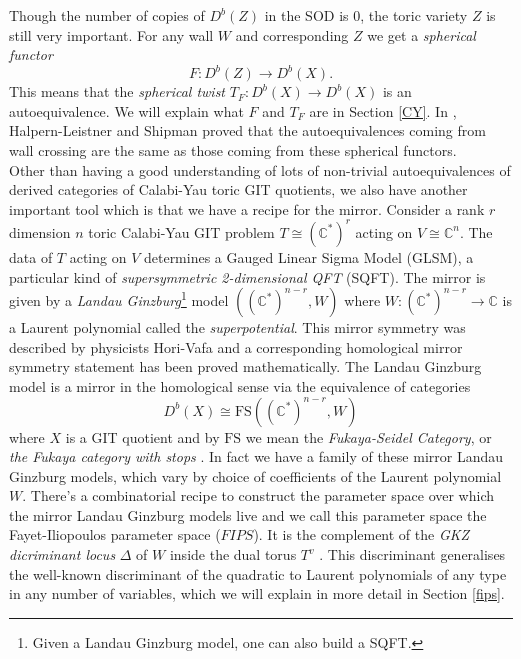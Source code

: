 \documentclass[oneside]{amsart}
\theoremstyle{definition}
\theoremstyle{definition}
\theoremstyle{definition}
\theoremstyle{definition}
\newcommand{\CC}{\mathbb{C}}
\begin{document}
\newline
Though the number of copies of $D^b(Z)$ in the SOD is 0, the toric variety $Z$ is still very important. For any wall $W$ and corresponding $Z$ we get a \textit{spherical functor}
$$
F : D^b(Z) \to D^b(X).
$$
This means that the \textit{spherical twist} $T_F: D^b(X) \to  D^b(X) $ is an autoequivalence. We will explain what $F$ and $T_F$ are in Section \ref{CY}. In \cite{gitauto}, Halpern-Leistner and Shipman proved that the autoequivalences coming from wall crossing are the same as those coming from these spherical functors. \\
\newline
Other than having a good understanding of lots of non-trivial autoequivalences of derived categories of Calabi-Yau toric GIT quotients, we also have another important tool which is that we have a recipe for the mirror. Consider a rank $r$ dimension $n$ toric Calabi-Yau GIT problem $T \cong (\CC^*)^r$ acting on $V \cong \CC^n$. The data of $T$ acting on $V$ determines a Gauged Linear Sigma Model (GLSM), a particular kind of \textit{supersymmetric 2-dimensional QFT} (SQFT). The mirror is given by a \textit{Landau Ginzburg}\footnote{Given a Landau Ginzburg model, one can also build a SQFT.} model $(({\CC}^*)^{n-r}, W) $ where $W: ({\CC}^*)^{n-r} \to \CC$ is a Laurent polynomial called the \textit{superpotential}. This mirror symmetry was described by physicists Hori-Vafa \cite{horivafa} and a corresponding homological mirror symmetry statement has been proved mathematically. The Landau Ginzburg model is a mirror in the homological sense via the equivalence of categories
\begin{equation*}
    D^b(X) \cong \text{FS}(({\CC}^*)^{n-r}, W)
\end{equation*}
where $X$ is a GIT quotient and by $\text{FS}$ we mean the \textit{Fukaya-Seidel Category}, or \textit{the Fukaya category with stops} \cite{seidelfukaya}.
In fact we have a family of these mirror Landau Ginzburg models, which vary by choice of coefficients of the Laurent polynomial $W$. There's a combinatorial recipe to construct the parameter space over which the mirror Landau Ginzburg models live and we call this parameter space the Fayet-Iliopoulos parameter space ($FIPS$). It is the complement of the \textit{GKZ dicriminant locus} $\Delta$ of $W$ inside the dual torus $T^v$ \cite{gelfand1994discriminants}. This discriminant generalises the well-known discriminant of the quadratic to Laurent polynomials of any type in any number of variables, which we will explain in more detail in Section \ref{fips}. \\
\end{document}

